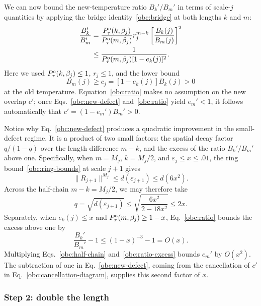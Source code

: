 We can now bound the new-temperature ratio $B_k'/B_m'$ in terms of scale-$j$ quantities by applying the bridge identity~\eqref{obc:bridge} at both lengths $k$ and $m$:
\begin{align}
 \frac{B_k'}{B_m'}
 &=\frac{P_{\tau}^{\mathrm{o}}(k,\beta_j)}{P_{\tau}^{\mathrm{o}}(m,\beta_j)}
   r_j^{m-k}\left[\frac{B_k(j)}{B_m(j)}\right]^2\notag \\
 &\le\frac{1}{P_{\tau}^{\mathrm{o}}(m,\beta_j)[1-e_k(j)]^2}.
 \label{obc:ratio}
\end{align}
Here we used $P_{\tau}^{\mathrm{o}}(k,\beta_j)\le1$, $r_j\le1$, and the lower bound
\[
 B_m(j)\ge c_j=[1-e_k(j)]B_k(j)>0
\]
at the old temperature. Equation~\eqref{obc:ratio} makes no assumption on the new overlap $c'$; once Eqs.~\eqref{obc:new-defect} and~\eqref{obc:ratio} yield
$e_m'<1$, it follows automatically that $c'=(1-e_m')B_m'>0$.

Notice why Eq.~\eqref{obc:new-defect} produces a quadratic improvement in the small-defect regime. It is a product of two small factors: the spatial decay factor $q/(1-q)$ over the length difference $m-k$, and the excess of the ratio $B_k'/B_m'$ above one.
Specifically, when $m=M_j$, $k=M_j/2$, and $\varepsilon_j\le x\le.01$,
the ring bound~\eqref{obc:ring-bounds} at scale $j+1$ gives
\[
 \|R_{j+1}\|^{M_j}\le d(\varepsilon_{j+1})
 \le d(6x^2).
\]
Across the half-chain $m-k=M_j/2$, we may therefore take
\begin{equation}
 q=\sqrt{d(\varepsilon_{j+1})}
 \le\sqrt{\frac{6x^2}{2-18x^2}}\le2x.
 \label{obc:half-chain}
\end{equation}
Separately, when $e_k(j)\le x$ and
$P_{\tau}^{\mathrm{o}}(m,\beta_j)\ge1-x$, Eq.~\eqref{obc:ratio} bounds the excess above one by
\begin{equation}
 \frac{B_k'}{B_m'}-1\le(1-x)^{-3}-1=O(x).
 \label{obc:ratio-excess}
\end{equation}
Multiplying Eqs.~\eqref{obc:half-chain} and~\eqref{obc:ratio-excess} bounds $e_m'$ by $O(x^2)$. The subtraction of one in Eq.~\eqref{obc:new-defect}, coming from the cancellation of $c'$ in Eq.~\eqref{obc:cancellation-diagram}, supplies this second factor of $x$.

\subsubsection{Step 2: double the length}
\label{obc:move-two}

